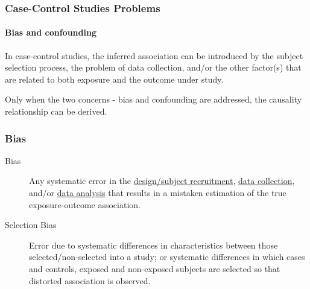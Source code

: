 \documentclass[table,10pt]{beamer}
\begin{document}
\begin{CJK*}{UTF8}{gbsn}
\begin{frame}[t]
\frametitle{Case-Control Studies Problems}
\framesubtitle{Bias and confounding}
In case-control studies, the inferred association can be introduced by the 
subject selection process, the problem of data collection, and/or the other 
factor(s) that are related to both exposure and the outcome under study.

Only when the two concerns - \alert{bias and confounding} are addressed, the 
causality relationship can be derived.
\end{frame}


\begin{frame}[t]
\frametitle{Bias}
\begin{description}
	\item[Bias]{Any systematic error in the \underline{design/subject recruitment}, 
		\underline{data collection}, and/or \underline{data analysis} that 
		results in a mistaken estimation of the true exposure-outcome association.}
	\item[Selection Bias]{Error due to systematic differences in characteristics 
		between those selected/non-selected into a study; or systematic differences 
		in which cases and controls, exposed and non-exposed subjects are selected 
		so that distorted association is observed.}
\end{description}
\end{frame}


\end{CJK*}
\end{document}
